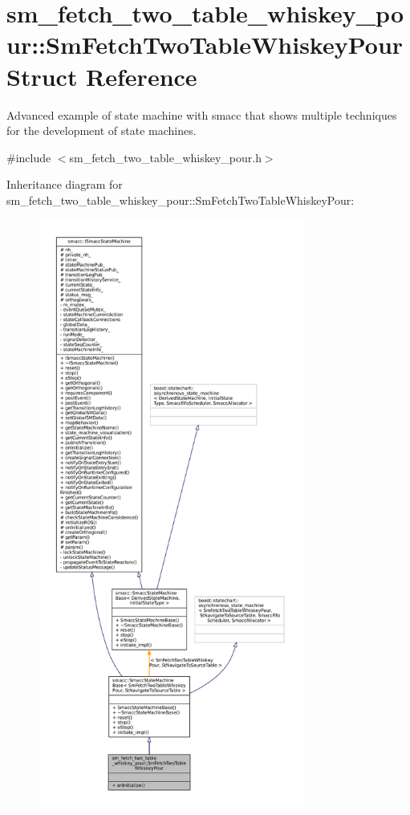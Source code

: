 \hypertarget{structsm__fetch__two__table__whiskey__pour_1_1SmFetchTwoTableWhiskeyPour}{}\section{sm\+\_\+fetch\+\_\+two\+\_\+table\+\_\+whiskey\+\_\+pour\+:\+:Sm\+Fetch\+Two\+Table\+Whiskey\+Pour Struct Reference}
\label{structsm__fetch__two__table__whiskey__pour_1_1SmFetchTwoTableWhiskeyPour}


Advanced example of state machine with smacc that shows multiple techniques for the development of state machines.  




{\ttfamily \#include $<$sm\+\_\+fetch\+\_\+two\+\_\+table\+\_\+whiskey\+\_\+pour.\+h$>$}



Inheritance diagram for sm\+\_\+fetch\+\_\+two\+\_\+table\+\_\+whiskey\+\_\+pour\+:\+:Sm\+Fetch\+Two\+Table\+Whiskey\+Pour\+:
\nopagebreak
\begin{figure}[H]
\begin{center}
\leavevmode
\includegraphics[height=550pt]{structsm__fetch__two__table__whiskey__pour_1_1SmFetchTwoTableWhiskeyPour__inherit__graph}
\end{center}
\end{figure}


